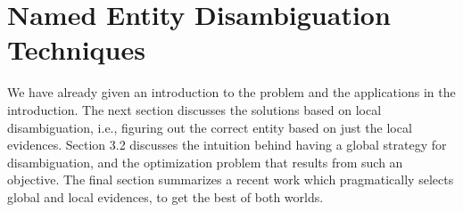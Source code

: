 \section{Named Entity Disambiguation Techniques}
\label{secned}
We have already given an introduction to the problem and the applications in the introduction.
The next section discusses the solutions based on local disambiguation, i.e., figuring 
out the correct entity based on just the local evidences. Section 3.2 discusses the intuition
behind having a global strategy for disambiguation, and the optimization problem that
results from such an objective. The final section summarizes a recent work which 
pragmatically selects global and local evidences, to get the best of both worlds.
